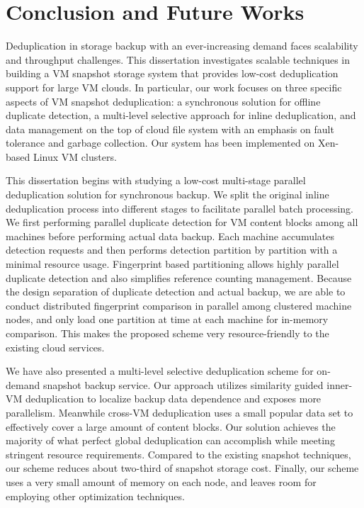 \chapter{Conclusion and Future Works}
\label{chap:concl}
Deduplication in storage backup with an ever-increasing demand faces 
scalability and throughput challenges.  This dissertation investigates 
scalable techniques in building a VM snapshot storage system that provides low-cost
deduplication support for large VM clouds.  In particular, our work focuses on 
three specific  aspects  of VM snapshot deduplication: a synchronous solution for offline duplicate detection,
a multi-level selective approach for inline deduplication, and data management on the top of
cloud file system with an emphasis on fault tolerance and garbage collection.
Our system  has  been  implemented on Xen-based Linux VM clusters.

This dissertation begins with studying a low-cost multi-stage
parallel deduplication solution for synchronous backup. 
We split the original inline deduplication process into different stages to
facilitate parallel batch processing.
We first performing parallel duplicate detection for VM content blocks among all
machines before performing actual data backup. Each
machine accumulates detection requests and then performs 
detection partition by partition with a minimal resource usage. 
Fingerprint based partitioning allows
highly parallel duplicate detection and also simplifies
reference counting management.
Because the design separation
of duplicate detection and actual backup, we are able
to conduct distributed fingerprint comparison in parallel among clustered machine nodes, 
and only load one partition at time
at each machine for in-memory comparison.
This makes the proposed scheme very resource-friendly 
to the existing cloud services.

We have also presented a multi-level selective deduplication scheme for 
on-demand snapshot backup service. Our approach utilizes similarity guided inner-VM
deduplication to localize backup data dependence and exposes
more parallelism. Meanwhile cross-VM deduplication uses
a small popular data set to effectively cover a large amount of  content blocks. 
Our solution achieves the majority of what perfect
global deduplication can accomplish while meeting stringent 
resource requirements. Compared to the existing snapshot techniques, 
our scheme reduces about two-third
of snapshot storage cost. Finally, our scheme uses a very
small amount of memory on each node, and leaves room for employing other
optimization techniques. 

